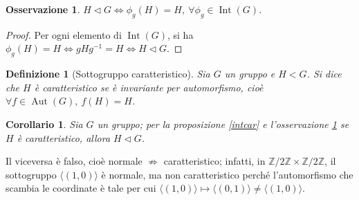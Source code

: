 \documentclass[12pt]{scrartcl}
\theoremstyle{style}
\newtheorem{definizione}{Definizione}[section]
\newtheorem{corollario}{Corollario}[teorema]
\newtheorem{osservazione}{Osservazione}[section]
\numberwithin{equation}{subsection}
\begin{document}
\begin{osservazione}\label{ossnorm}
	$H \lhd G \iff \phi _g(H) = H, \ \forall \phi _g \in \operatorname{Int} (G)$.
	\end{osservazione}
	\begin{proof}
Per ogni elemento di $\operatorname{Int} (G)$, si ha $\phi _g (H) = H \iff gH g^{-1} = H \iff H \lhd G$.
	\end{proof}
\begin{definizione}
	[Sottogruppo caratteristico]
	Sia $G$ un gruppo e $H < G$. Si dice che $H$ \`e \textit{caratteristico} se \`e invariante per automorfismo, cio\`e $\forall f \in \operatorname{Aut} (G), \ f(H) = H$.
\end{definizione}
\begin{corollario}
	Sia $G$ un gruppo; per la proposizione \ref{intcar} e l'osservazione \ref{ossnorm} se $H$ \`e caratteristico, allora $H \lhd G$.
\end{corollario}
\noindent Il viceversa \`e falso, cio\`e normale $\not\Rightarrow $ caratteristico; infatti, in $\mathbb{Z} / 2\mathbb{Z} \times  \mathbb{Z} / 2\mathbb{Z}$, il sottogruppo $\langle (1,0) \rangle$ \`e normale, ma non caratteristico perch\'e l'automorfismo che scambia le coordinate \`e tale per cui $\langle (1,0) \rangle\mapsto \langle (0,1) \rangle\neq \langle (1,0) \rangle$.
\end{document}
